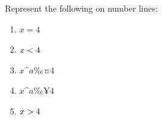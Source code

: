       \label{m39254*id157128}Represent the following
on number lines:\par 
      \label{m39254*id157134}\begin{enumerate}[noitemsep, label=\textbf{\arabic*}. ] 
            \label{m39254*uid77}\item 
          \begin{math}x=4\end{math}
        \label{m39254*uid78}\item 
          \begin{math}x<{}4\end{math}
        \label{m39254*uid79}\item 
          \begin{math}x\^{a}‰¤4\end{math}
        \label{m39254*uid80}\item 
          \begin{math}x\^{a}‰¥4\end{math}
        \label{m39254*uid81}\item 
          \begin{math}x>{}4\end{math}
        \end{enumerate}
        
      

